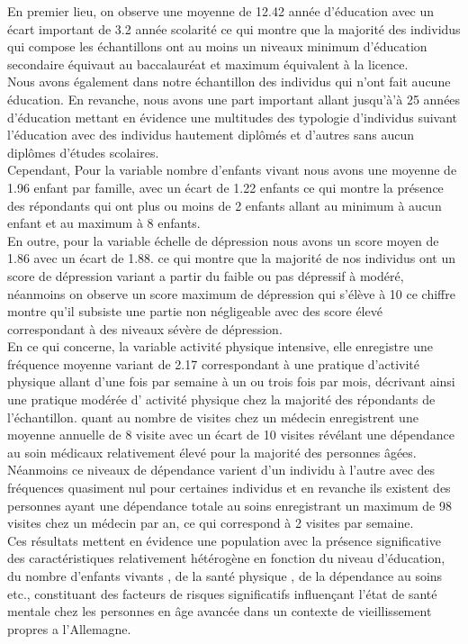 \documentclass[a4paper]{article}
\begin{document}
	En premier lieu, on observe une moyenne de 12.42 année d'éducation avec un écart important de 3.2 année scolarité ce qui montre que la majorité des individus qui compose les échantillons ont au moins un niveaux minimum d'éducation secondaire  équivaut au baccalauréat et maximum équivalent à la licence.\\
	 Nous avons également dans notre échantillon des individus qui n’ont fait aucune éducation. En revanche, nous avons une part important allant jusqu'à'à 25 années d'éducation mettant en évidence une multitudes des typologie d’individus suivant l'éducation avec des individus hautement diplômés et d'autres sans aucun diplômes d'études scolaires.\\
	Cependant, Pour la variable nombre d'enfants vivant nous avons une moyenne de 1.96 enfant par famille, avec un écart de 1.22 enfants ce qui montre la présence des répondants qui ont plus ou moins de 2 enfants allant au minimum à aucun enfant et au maximum à 8 enfants.\\
	En outre, pour la variable échelle de dépression nous avons un score moyen de 1.86 avec un écart de 1.88. ce qui montre que la majorité de nos individus ont un score de dépression variant a partir du faible ou pas dépressif à modéré, néanmoins on observe un score maximum de dépression qui s'élève à 10 ce chiffre montre qu'il subsiste une partie non négligeable avec des score élevé correspondant à des niveaux sévère de dépression.\\
	En ce qui concerne, la variable activité physique intensive, elle enregistre une fréquence moyenne variant de 2.17 correspondant à une pratique d’activité physique allant d'une fois par semaine à un ou trois fois par mois, décrivant ainsi une  pratique modérée d' activité physique chez la majorité des répondants  de  l'échantillon. quant au nombre de visites chez un médecin enregistrent une moyenne annuelle de 8 visite  avec un écart de 10 visites révélant une dépendance au soin médicaux relativement élevé pour la majorité des personnes âgées. Néanmoins  ce niveaux de dépendance varient d’un individu à l'autre avec des fréquences quasiment nul pour certaines individus et en revanche ils existent des personnes  ayant une dépendance totale au soins enregistrant un maximum de 98 visites chez un médecin par an, ce qui correspond à 2 visites par semaine.\\ 
	Ces résultats mettent en évidence une population avec la présence significative des caractéristiques relativement hétérogène en fonction du niveau d'éducation, du nombre d’enfants vivants , de la santé physique , de la dépendance au soins etc., constituant des facteurs de risques significatifs influençant l'état de santé mentale chez les personnes en âge avancée dans un contexte de vieillissement propres a l'Allemagne.\\
	
\end{document}
